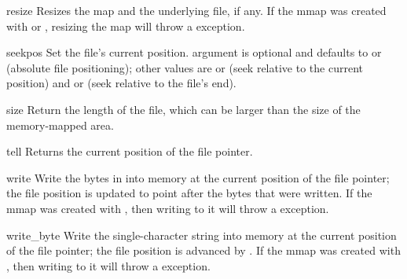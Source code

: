 \begin{methoddesc}[mmap]{resize}{}
  Resizes the map and the underlying file, if any.
  If the mmap was created with  or
  , resizing the map will throw a  exception.
\end{methoddesc}

\begin{methoddesc}[mmap]{seek}{pos}
  Set the file's current position.   argument is optional
  and defaults to  or  (absolute file
  positioning); other values are  or  (seek
  relative to the current position) and  or 
  (seek relative to the file's end).
\end{methoddesc}

\begin{methoddesc}[mmap]{size}{}
  Return the length of the file, which can be larger than the size of
  the memory-mapped area.
\end{methoddesc}

\begin{methoddesc}[mmap]{tell}{}
  Returns the current position of the file pointer.
\end{methoddesc}

\begin{methoddesc}[mmap]{write}{}
  Write the bytes in  into memory at the current position
  of the file pointer; the file position is updated to point after the
  bytes that were written. If the mmap was created with
  , then writing to it will throw a
   exception.
\end{methoddesc}

\begin{methoddesc}[mmap]{write_byte}{}
  Write the single-character string  into memory at the
  current position of the file pointer; the file position is advanced
  by . If the mmap was created with ,
  then writing to it will throw a  exception.
\end{methoddesc}
